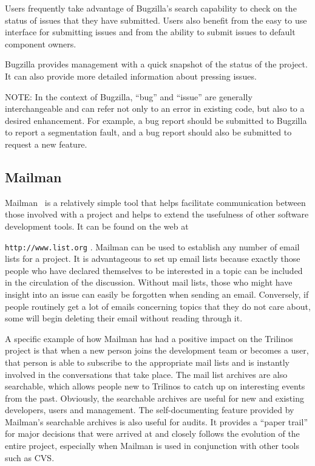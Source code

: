 \documentclass[12pt,relax]{article}
\newcommand{\InlineDirectory}[1]{
  {\hspace{0.01 in}} {\tt #1} {\hspace{0.01 in}}}
\begin{document}
Users frequently take advantage of Bugzilla's search capability to check on 
the status of issues that they have submitted.  Users also benefit from the 
easy to use interface for submitting issues and from the ability to submit 
issues to default component owners.  

Bugzilla provides management with a quick snapshot of the status of the 
project.  It can also provide more detailed information about pressing issues.

NOTE: In the context of Bugzilla, ``bug'' and ``issue'' are generally 
interchangeable and can refer not only to an error in 
existing code, but also to a desired enhancement.  For example, a bug report 
should be submitted to Bugzilla to report a segmentation fault, and a bug 
report should also be submitted to request a new feature.

\subsection{Mailman}
\label{subsect:MailMan}
Mailman~\cite{Mailman} is a relatively simple tool that helps facilitate 
communication between
those involved with a project and helps to extend the usefulness of other 
software development tools.  It can be found on the web at 
\InlineDirectory{http://www.list.org}.  Mailman can be used to establish any 
number of 
email lists for a project.  It is advantageous to set up email lists because exactly 
those people who have declared themselves to be interested in a 
topic can be included in the circulation of the discussion.  Without 
mail lists, those who might have insight into an issue can easily be forgotten 
when sending an email.  Conversely, if people routinely get a lot of emails 
concerning topics that they do not care about, some will begin deleting
their email without reading through it.  

A specific example of how Mailman 
has had a positive impact on the Trilinos project is that when a new person
joins the development team or becomes a user, that person is able to 
subscribe to the appropriate mail lists and is instantly involved in the 
conversations that take place.  The mail list archives are also searchable, 
which allows people new to Trilinos to catch up on interesting events from the 
past.  Obviously, the searchable archives are useful for new and existing 
developers, users and management.  The self-documenting feature provided 
by Mailman's searchable archives is also useful for audits.  It provides a 
``paper trail'' for major decisions that were arrived at and closely follows 
the evolution of the entire project, especially when Mailman is used in 
conjunction with other tools such as CVS.
\end{document}
